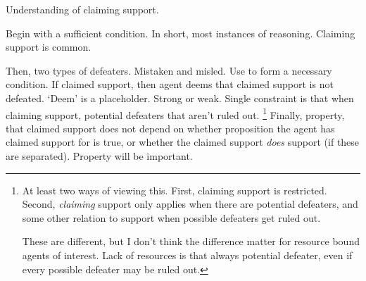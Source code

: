 \begin{note}
  Understanding of claiming support.

  Begin with a sufficient condition.
  In short, most instances of reasoning.
  Claiming support is common.

  Then, two types of defeaters.
  Mistaken and misled.
  Use to form a necessary condition.
  If claimed support, then agent deems that claimed support is not defeated.
  `Deem' is a placeholder.
  Strong or weak.
  Single constraint is that when claiming support, potential defeaters that aren't ruled out.\nolinebreak
  \footnote{
    At least two ways of viewing this.
    First, claiming support is restricted.
    Second, \emph{claiming} support only applies when there are potential defeaters, and some other relation to support when possible defeaters get ruled out.

    These are different, but I don't think the difference matter for resource bound agents of interest.
    Lack of resources is that always potential defeater, even if every possible defeater may be ruled out.
    }
  Finally, property, that claimed support does not depend on whether proposition the agent has claimed support for is true, or whether the claimed support \emph{does} support (if these are separated).
  Property will be important.
\end{note}

